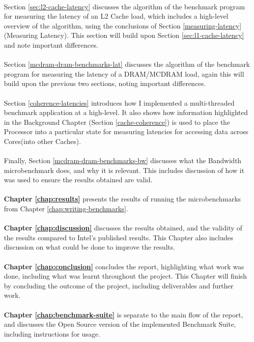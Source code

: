 \documentclass[bsc,frontabs,twoside,singlespacing,parskip,deptreport]{infthesis}     %
\begin{document}
\\
Section \ref{sec:l2-cache-latency} discusses the algorithm of the benchmark program for measuring the latency of an L2 Cache load, which includes a high-level overview of the algorithm, using the conclusions of Section \ref{measuring-latency}(Measuring Latency). This section will build upon Section \ref{sec:l1-cache-latency} and note important differences. \\
\\
Section \ref{mcdram-dram-benchmarks-lat} discusses the algorithm of the benchmark program for measuring the latency of a DRAM/MCDRAM load, again this will build upon the previous two sections, noting important differences. \\
\\
Section \ref{coherence-latencies} introduces how I implemented a multi-threaded benchmark application at a high-level. It also shows how information highlighted in the Background Chapter (Section \ref{cache-coherence}) is used to place the Processor into a particular state for measuring latencies for accessing data across Cores(into other Caches). \\
\\
Finally, Section \ref{mcdram-dram-benchmarks-bw} discusses what the Bandwidth microbenchmark does, and why it is relevant. This includes discussion of how it was used to ensure the results obtained are valid. \\
\\
\textbf{Chapter \ref{chap:results}} presents the results of running the microbenchmarks from Chapter \ref{chap:writing-benchmarks}. \\
\\
\textbf{Chapter \ref{chap:discussion}} discusses the results obtained, and the validity of the results compared to Intel's published results. This Chapter also includes discussion on what could be done to improve the results. \\
\\
\textbf{Chapter \ref{chap:conclusion}} concludes the report, highlighting what work was done, including what was learnt throughout the project. This Chapter will finish by concluding the outcome of the project, including deliverables and further work. \\
\\
\textbf{Chapter \ref{chap:benchmark-suite}} is separate to the main flow of the report, and discusses the Open Source version of the implemented Benchmark Suite, including instructions for usage.
\end{document}
